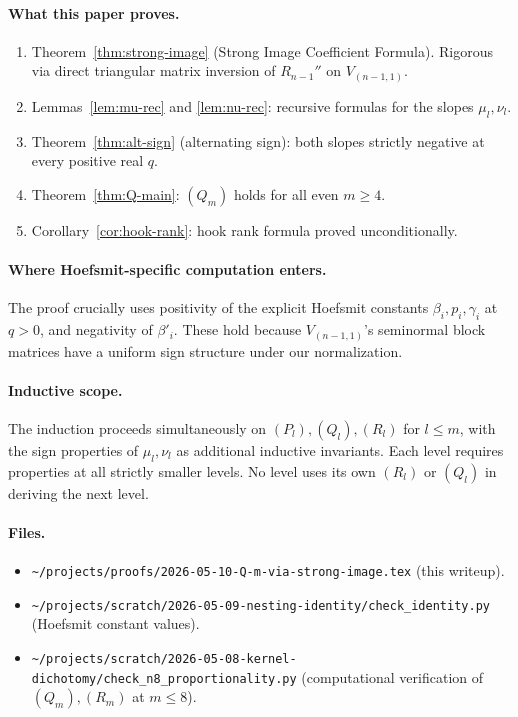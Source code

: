 \documentclass[11pt]{article}
\theoremstyle{definition}
\begin{document}
\paragraph{What this paper proves.}
\begin{enumerate}[topsep=0.3em,itemsep=0.2em,leftmargin=2em]
\item Theorem~\ref{thm:strong-image} (Strong Image Coefficient
  Formula).  Rigorous via direct triangular matrix inversion of
  $R_{n-1}''$ on $V_{(n-1,1)}$.
\item Lemmas~\ref{lem:mu-rec} and \ref{lem:nu-rec}: recursive
  formulas for the slopes $\mu_l, \nu_l$.
\item Theorem~\ref{thm:alt-sign} (alternating sign): both slopes
  strictly negative at every positive real $q$.
\item Theorem~\ref{thm:Q-main}: $(Q_m)$ holds for all even $m \ge 4$.
\item Corollary~\ref{cor:hook-rank}: hook rank formula proved
  unconditionally.
\end{enumerate}

\paragraph{Where Hoefsmit-specific computation enters.}
The proof crucially uses positivity of the explicit Hoefsmit
constants $\beta_i, p_i, \gamma_i$ at $q > 0$, and negativity of
$\beta'_i$.  These hold because $V_{(n-1,1)}$'s seminormal block
matrices have a uniform sign structure under our normalization.

\paragraph{Inductive scope.}
The induction proceeds simultaneously on $(P_l), (Q_l), (R_l)$ for
$l \le m$, with the sign properties of $\mu_l, \nu_l$ as additional
inductive invariants.  Each level requires properties at all
strictly smaller levels.  No level uses its own $(R_l)$ or $(Q_l)$
in deriving the next level.

\paragraph{Files.}
\begin{itemize}[topsep=0.3em,itemsep=0.2em,leftmargin=2em]
\item \texttt{\textasciitilde/projects/proofs/2026-05-10-Q-m-via-strong-image.tex} (this writeup).
\item \texttt{\textasciitilde/projects/scratch/2026-05-09-nesting-identity/check\_identity.py}
  (Hoefsmit constant values).
\item \texttt{\textasciitilde/projects/scratch/2026-05-08-kernel-dichotomy/check\_n8\_proportionality.py}
  (computational verification of $(Q_m), (R_m)$ at $m \le 8$).
\end{itemize}
\end{document}
